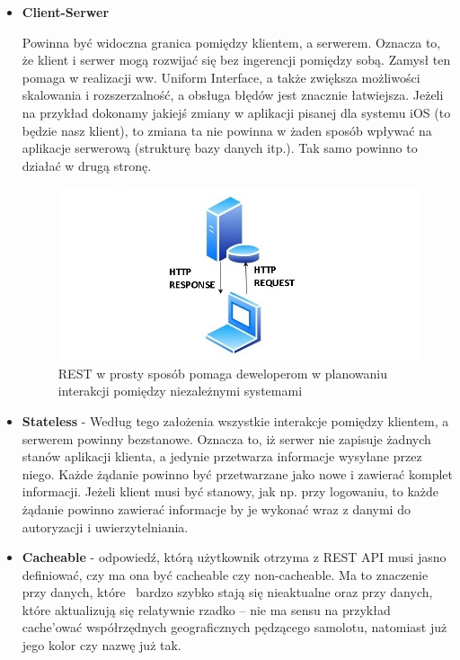 \documentclass[oneside,polski,logo,indent]{amuthesis}
\begin{document}
\begin{itemize}
\item \textbf{Client-Serwer}

Powinna być widoczna granica pomiędzy klientem, a serwerem. Oznacza to, że klient i serwer mogą rozwijać się bez ingerencji pomiędzy sobą. Zamysł ten pomaga w realizacji ww. Uniform Interface, a także zwiększa możliwości skalowania i rozszerzalność, a obsługa błędów jest znacznie łatwiejsza. Jeżeli na przykład dokonamy jakiejś zmiany w aplikacji pisanej dla systemu iOS (to będzie nasz klient), to zmiana ta nie powinna w żaden sposób wpływać na aplikacje serwerową (strukturę bazy danych itp.). Tak samo powinno to działać w drugą stronę. 

\begin{figure}[H]
\centering
\includegraphics[width=14cm]{rest.jpg}
\caption{REST w prosty sposób pomaga deweloperom w planowaniu interakcji pomiędzy niezależnymi systemami}
\label{REST}
\end{figure}

\item \textbf{Stateless} - Według tego założenia wszystkie interakcje pomiędzy klientem, a serwerem powinny bezstanowe. Oznacza to, iż serwer nie zapisuje żadnych stanów aplikacji klienta, a jedynie przetwarza informacje wysyłane przez niego. Każde żądanie powinno być przetwarzane jako nowe i zawierać komplet informacji. Jeżeli klient musi być stanowy, jak np. przy logowaniu, to każde żądanie powinno zawierać informacje by je wykonać wraz z danymi do autoryzacji i uwierzytelniania.\newline 

\item \textbf{Cacheable} - odpowiedź, którą użytkownik otrzyma z REST API musi jasno definiować, czy ma ona być cacheable czy non-cacheable. Ma to znaczenie przy danych, które~ bardzo szybko stają się nieaktualne oraz przy danych, które aktualizują się relatywnie rzadko – nie ma sensu na przykład cache’ować współrzędnych geograficznych pędzącego samolotu, natomiast już jego kolor czy nazwę już tak.\newline


\end{itemize}
\end{document}
